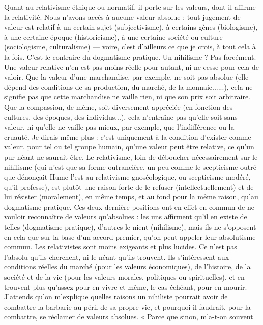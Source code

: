 Quant au relativisme éthique ou normatif, il porte sur les valeurs, dont
il affirme la relativité. Nous n’avons accès à aucune valeur absolue ; tout
jugement de valeur est relatif à un certain sujet (subjectivisme), à certains
gènes (biologisme), à une certaine époque (historicisme), à une certaine
société ou culture (sociologisme, culturalisme) — voire, c’est d’ailleurs ce que
je crois, à tout cela à la fois. C’est le contraire du dogmatisme pratique. Un
nihilisme ? Pas forcément. Une valeur relative n’en est pas moins réelle pour
autant, ni ne cesse pour cela de valoir. Que la valeur d’une marchandise, par
exemple, ne soit pas absolue (elle dépend des conditions de sa production, du
marché, de la monnaie......), cela ne signifie pas que cette marchandise ne vaille
rien, ni que son prix soit arbitraire. Que la compassion, de même, soit diversement
appréciée (en fonction des cultures, des époques, des individus...), cela
n'entraîne pas qu’elle soit sans valeur, ni qu’elle ne vaille pas mieux, par
exemple, que l'indifférence ou la cruauté. Je dirais même plus : c’est uniquement
à la condition d’exister comme valeur, pour tel ou tel groupe humain,
qu'une valeur peut être relative, ce qu’un pur néant ne saurait être. Le relativisme,
loin de déboucher nécessairement sur le nihilisme (qui n’est que sa
forme outrancière, un peu comme le scepticisme outré que dénonçait Hume
l'est au relativisme gnoséologique, ou scepticisme modéré, qu’il professe), est
plutôt une raison forte de le refuser (intellectuellement) et de lui résister (moralement),
en même temps, et au fond pour la même raison, qu’au dogmatisme
pratique. Ces deux dernière positions ont en effet en commun de ne vouloir
reconnaître de valeurs qu’absolues : les uns affirment qu’il en existe de telles
(dogmatisme pratique), d’autres le nient (nihilisme), mais ils ne s’opposent en
cela que sur la base d’un accord premier, qu’on peut appeler leur absolutisme
commun. Les relativistes sont moins exigeants et plus lucides. Ce n’est pas
l'absolu qu’ils cherchent, ni le néant qu’ils trouvent. Ils s'intéressent aux conditions
réelles du marché (pour les valeurs économiques), de l’histoire, de la
société et de la vie (pour les valeurs morales, politiques ou spirituelles), et en
trouvent plus qu’assez pour en vivre et même, le cas échéant, pour en mourir.
J'attends qu’on m'explique quelles raisons un nihiliste pourrait avoir de combattre
la barbarie au péril de sa propre vie, et pourquoi il faudrait, pour la combattre,
se réclamer de valeurs absolues. « Parce que sinon, m’a-t-on souvent
